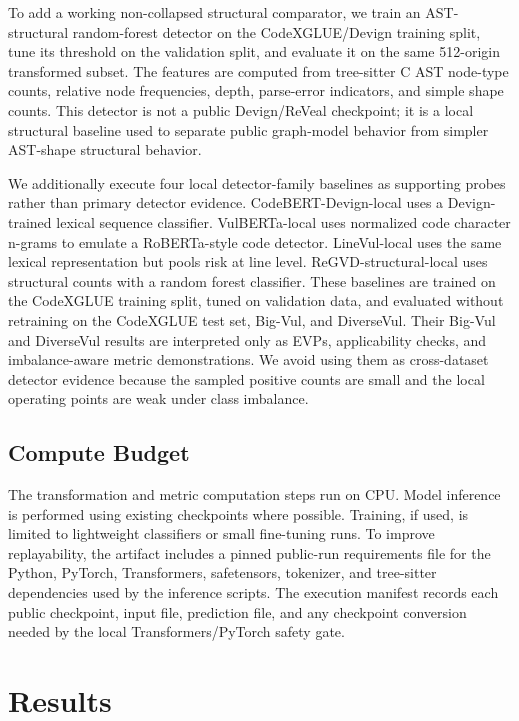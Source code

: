 \documentclass[a4paper,fleqn]{cas-dc}
\begin{document}
To add a working non-collapsed structural comparator, we train an
AST-structural random-forest detector on the CodeXGLUE/Devign training split,
tune its threshold on the validation split, and evaluate it on the same
512-origin transformed subset. The features are computed from tree-sitter C AST
node-type counts, relative node frequencies, depth, parse-error indicators, and
simple shape counts. This detector is not a public Devign/ReVeal checkpoint; it
is a local structural baseline used to separate public graph-model behavior
from simpler AST-shape structural behavior.

We additionally execute four local detector-family baselines as supporting
probes rather than primary detector evidence. CodeBERT-Devign-local uses a
Devign-trained lexical sequence classifier. VulBERTa-local uses normalized
code character n-grams to emulate a RoBERTa-style code detector.
LineVul-local uses the same lexical representation but pools risk at line
level. ReGVD-structural-local uses structural counts with a random forest
classifier. These baselines are trained on the CodeXGLUE training split, tuned
on validation data, and evaluated without retraining on the CodeXGLUE test set,
Big-Vul, and DiverseVul. Their Big-Vul and DiverseVul results are interpreted
only as EVPs, applicability checks, and imbalance-aware metric demonstrations.
We avoid using them as cross-dataset detector evidence because the sampled
positive counts are small and the local operating points are weak under class
imbalance.

\subsection{Compute Budget}

The transformation and metric computation steps run on CPU. Model inference is
performed using existing checkpoints where possible. Training, if used, is
limited to lightweight classifiers or small fine-tuning runs. To improve
replayability, the artifact includes a pinned public-run requirements file for
the Python, PyTorch, Transformers, safetensors, tokenizer, and tree-sitter
dependencies used by the inference scripts. The execution manifest records
each public checkpoint, input file, prediction file, and any checkpoint
conversion needed by the local Transformers/PyTorch safety gate.

\section{Results}
\end{document}

